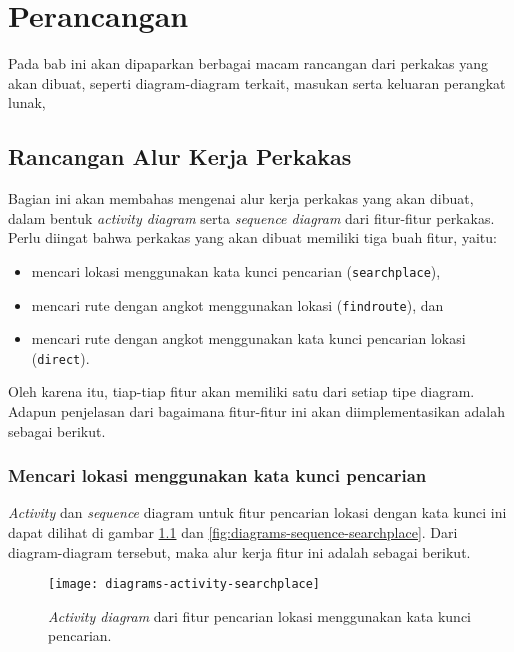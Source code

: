 \chapter{Perancangan}
\label{chap:design}

Pada bab ini akan dipaparkan berbagai macam rancangan dari perkakas \cl yang akan dibuat, seperti diagram-diagram terkait, masukan serta keluaran perangkat lunak,

\section{Rancangan Alur Kerja Perkakas}
\label{sec:design-flow}

Bagian ini akan membahas mengenai alur kerja perkakas yang akan dibuat, dalam bentuk \textit{activity diagram} serta \textit{sequence diagram} dari fitur-fitur perkakas. Perlu diingat bahwa perkakas yang akan dibuat memiliki tiga buah fitur, yaitu:

\begin{itemize}
	\item mencari lokasi menggunakan kata kunci pencarian (\verb|searchplace|),
	\item mencari rute dengan angkot menggunakan \latlon lokasi (\verb|findroute|), dan
	\item mencari rute dengan angkot menggunakan kata kunci pencarian lokasi (\verb|direct|).
\end{itemize}

\noindent
Oleh karena itu, tiap-tiap fitur akan memiliki satu dari setiap tipe diagram. Adapun penjelasan dari bagaimana fitur-fitur ini akan diimplementasikan adalah sebagai berikut.


\subsection{Mencari lokasi menggunakan kata kunci pencarian}
\label{sec:design-flow-searchplace}

\textit{Activity} dan \textit{sequence} diagram untuk fitur pencarian lokasi dengan kata kunci ini dapat dilihat di gambar \ref{fig:diagrams-activity-searchplace} dan \ref{fig:diagrams-sequence-searchplace}. Dari diagram-diagram tersebut, maka alur kerja fitur ini adalah sebagai berikut.

\begin{figure}[h]
    \centering
    \texttt{[image: diagrams-activity-searchplace]}
    \caption[\textit{Activity diagram} fitur pencarian lokasi menggunakan kata kunci lokasi]{\textit{Activity diagram} dari fitur pencarian lokasi menggunakan kata kunci pencarian.}
    \label{fig:diagrams-activity-searchplace}
\end{figure}

